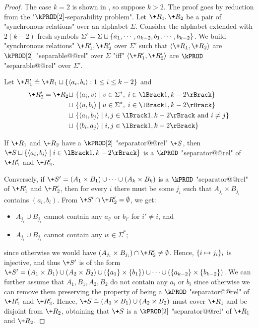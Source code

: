\begin{proof}
    The case $k=2$ is shown in , so suppose $k>2$.
    The proof goes by reduction from the "$\kPROD[2]$-separability problem". Let $\+R_1,\+R_2$ be a pair of "synchronous relations" over an alphabet $\Sigma$. Consider the alphabet extended with $2(k-2)$ fresh symbols $\Sigma' = \Sigma \sqcup \{a_1, \cdots, a_{k-2}, b_1, \cdots, b_{k-2}\}$. We build "synchronous relations" $\+R'_1,\+R'_2$ over $\Sigma'$ such that $\tup{\+R_1, \+R_2}$ are $\kPROD[2]$ "separable@@rel" over $\Sigma$ "iff" $\tup{\+R'_1, \+R'_2}$ are $\kPROD$ "separable@@rel" over $\Sigma'$.

    Let $\+R'_1 \defeq \+R_1 \dcup \set{\tup{a_i,b_i} : 1 \leq i \leq k-2}$ and 
    \begin{align*}
    \+R'_2 =  \+R_2 \dcup~&\set{\tup{a_i,v} \mid v \in \Sigma^*,\; i \in \lBrack 1,k-2\rBrack} \\
    \dcup~&\set{\tup{u,b_i} \mid u \in \Sigma^*,\; i \in \lBrack 1,k-2\rBrack}\\
    \dcup~&\set{\tup{a_i,b_j} \mid i,j \in \lBrack 1,k-2\rBrack \text{ and } i \neq j}\\
    \dcup~&\set{\tup{b_i,a_j} \mid i,j \in \lBrack 1,k-2\rBrack}
    \end{align*}
    
    If $\+R_1$ and $\+R_2$ have a $\kPROD[2]$ "separator@@rel" $\+S$, then $\+S \dcup \set{\tup{a_i,b_i} \mid i \in \lBrack 1,k-2\rBrack}$ is a $\kPROD$ "separator@@rel" of $\+R'_1$ and $\+R'_2$.
    

    Conversely, if $\+S' = (A_1 \times B_1) \cup \dotsb \cup (A_k \times B_k)$ is a $\kPROD$ "separator@@rel" of $\+R'_1$ and $\+R'_2$, then for every $i$ there must be some $j_i$ such that $A_{j_i} \times B_{j_i}$ contains $(a_i,b_i)$. From $\+S' \cap \+R'_2 = \emptyset$, we get:
    \begin{itemize}
        \item $A_{j_i} \cup B_{j_i}$ cannot contain any $a_{i'}$ or $b_{i'}$ for $i' \neq i$, and
        \item $A_{j_i} \cup B_{j_i}$ cannot contain any $w \in \Sigma^*$;
    \end{itemize}
    since otherwise we would have $(A_{j_i} \times B_{j_i}) \cap \+R'_2 \neq \emptyset$.
    Hence, $\{i \mapsto j_i\}_i$ is injective, and thus $\+S'$ is of the form $\+S' = (A_1 \times B_1) \cup (A_2 \times B_2)  \cup (\set{a_1} \times \set{b_1}) \cup \dotsb \cup (\set{a_{k-2}} \times \set{b_{k-2}})$. We can further assume that $A_1,B_1,A_2,B_2$ do not contain any $a_i$ or $b_i$ since otherwise we can remove them preserving the property of being a $\kPROD$ "separator@@rel" of $\+R'_1$ and $\+R'_2$.
    Hence, $\+S \defeq (A_1 \times B_1) \cup (A_2 \times B_2)$ must cover $\+R_1$ and be disjoint from $\+R_2$, obtaining that $\+S$ is a $\kPROD[2]$ "separator@@rel" of $\+R_1$ and $\+R_2$.
\end{proof}


